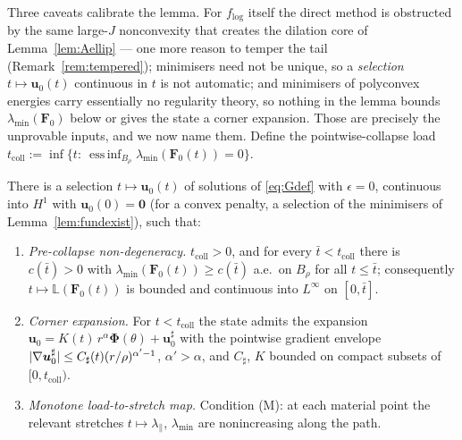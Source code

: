 Three caveats calibrate the lemma. For $f_{\log}$ itself the direct method is obstructed by the same large-$J$
nonconvexity that creates the dilation core of Lemma~\ref{lem:Aellip} --- one more reason to temper the tail
(Remark~\ref{rem:tempered}); minimisers need not be unique, so a \emph{selection} $t\mapsto\bm u_0(t)$ continuous in
$t$ is not automatic; and minimisers of polyconvex energies carry essentially no regularity theory, so nothing in the
lemma bounds $\lambda_{\min}(\bm F_0)$ below or gives the state a corner expansion. Those are precisely the
unprovable inputs, and we now name them. Define the pointwise-collapse load
$t_{\mathrm{coll}}:=\inf\{t:\ \operatorname*{ess\,inf}_{B_\rho}\lambda_{\min}(\bm F_0(t))=0\}$.

\begin{assumption}
    \label{ass:fp}
    There is a selection $t\mapsto\bm u_0(t)$ of solutions of \eqref{eq:Gdef} with $\epsilon=0$, continuous into
    $H^1$ with $\bm u_0(0)=\bm 0$ (for a convex penalty, a selection of the minimisers of
    Lemma~\ref{lem:fundexist}), such that:
    \begin{enumerate}
        \item[\textup{(i)}] \emph{Pre-collapse non-degeneracy.} $t_{\mathrm{coll}}>0$, and for every $\bar t<t_{\mathrm{coll}}$
              there is $c(\bar t)>0$ with $\lambda_{\min}(\bm F_0(t))\ge c(\bar t)$ a.e.\ on $B_\rho$ for all
              $t\le\bar t$; consequently $t\mapsto\mathbb{L}(\bm F_0(t))$ is bounded and continuous into $L^\infty$ on
              $[0,\bar t]$.
        \item[\textup{(ii)}] \emph{Corner expansion.} For $t<t_{\mathrm{coll}}$ the state admits the expansion
              $\bm u_0=K(t)\,r^\alpha\bm\Phi(\theta)+\bm u_0^\sharp$ with the pointwise gradient envelope
              $|\nabla\bm u_0^\sharp|\le C_\sharp(t)(r/\rho)^{\alpha'-1}$, $\alpha'>\alpha$, and $C_\sharp$, $K$
              bounded on compact subsets of $[0,t_{\mathrm{coll}})$.
        \item[\textup{(iii)}] \emph{Monotone load-to-stretch map.} Condition \textup{(M)}: at each material point the
              relevant stretches $t\mapsto\lambda_\parallel$, $\lambda_{\min}$ are nonincreasing along the path.
    \end{enumerate}
\end{assumption}

